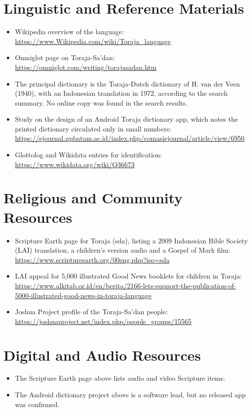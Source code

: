 \documentclass[12pt]{article}
\begin{document}
\section{Linguistic and Reference Materials}
\begin{itemize}
\item Wikipedia overview of the language: \url{https://www.Wikipedia.com/wiki/Toraja_language}
\item Omniglot page on Toraja-Sa'dan: \url{https://omniglot.com/writing/torajasadan.htm}
\item The principal dictionary is the Toraja-Dutch dictionary of H. van der Veen (1940), with an Indonesian translation in 1972, according to the search summary. No online copy was found in the search results.
\item Study on the design of an Android Toraja dictionary app, which notes the printed dictionary circulated only in small numbers: \url{https://ejournal.upbatam.ac.id/index.php/comasiejournal/article/view/6950}
\item Glottolog and Wikidata entries for identification: \url{https://www.wikidata.org/wiki/Q36673}
\end{itemize}

\section{Religious and Community Resources}
\begin{itemize}
\item Scripture Earth page for Toraja (sda), listing a 2009 Indonesian Bible Society (LAI) translation, a children's version audio and a Gospel of Mark film: \url{https://www.scriptureearth.org/00eng.php?iso=sda}
\item LAI appeal for 5,000 illustrated Good News booklets for children in Toraja: \url{https://www.alkitab.or.id/en/berita/2166-lets-support-the-publication-of-5000-illustrated-good-news-in-toraja-language}
\item Joshua Project profile of the Toraja-Sa'dan people: \url{https://joshuaproject.net/index.php/people_groups/15565}
\end{itemize}

\section{Digital and Audio Resources}
\begin{itemize}
\item The Scripture Earth page above lists audio and video Scripture items.
\item The Android dictionary project above is a software lead, but no released app was confirmed.
\end{itemize}
\end{document}
